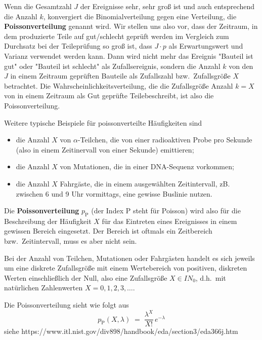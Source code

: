 
Wenn die Gesamtzahl $J$ der Ereignisse sehr, sehr groß ist und auch entsprechend die Anzahl $k$,
konvergiert die Binomialverteilung gegen eine Verteilung, die \textbf{Poissonverteilung} genannt wird.
Wir stellen uns also vor, dass der Zeitraum, in dem produzierte Teile auf gut/schlecht geprüft werden im
Vergleich zum Durchsatz bei der Teileprüfung so groß ist, dass $J \cdot p$ als Erwartungswert und Varianz
verwendet werden kann. Dann wird nicht mehr das Ereignis "Bauteil ist gut" oder "Bauteil ist schlecht"
als Zufallsereignis, sondern die Anzahl $k$ von den $J$ in einem Zeitraum geprüften Bauteile als
Zufallszahl bzw.\ Zufallsgröße $X$ betrachtet. Die Wahrscheinlichkeitsverteilung, die die Zufallsgröße
\glqq Anzahl $k = X$ von in einem Zeitraum als Gut geprüfte Teile\grqq beschreibt, ist also die Poissonverteilung.

Weitere typische Beispiele für poissonverteilte Häufigkeiten sind
\begin{itemize}
\item die Anzahl $X$ von $\alpha$-Teilchen, die von einer radioaktiven Probe pro Sekunde (also in einem Zeitinervall
von einer Sekunde) emittieren;
\item die Anzahl $X$ von Mutationen, die in einer DNA-Sequenz vorkommen;
\item die Anzahl $X$ Fahrgäste, die in einem ausgewählten Zeitintervall, zB. zwischen 6 und 9 Uhr vormittags, eine gewisse Buslinie nutzen.
\end{itemize}

Die \textbf{Poissonverteilung}  $p_\mathrm{P}$ (der Index $\mathrm{P}$ steht für Poisson) wird also für die Beschreibung
der Häufigkeit $X$ für das Eintreten eines Ereignisses in einem gewissen Bereich  eingesetzt.
Der Bereich ist oftmals ein Zeitbereich bzw.\ Zeitintervall, muss es aber nicht sein.

Bei der Anzahl von Teilchen, Mutationen oder Fahrgästen handelt es sich jeweils um eine
diskrete Zufallsgröße mit einem Wertebereich von positiven, diskreten Werten einschließlich der Null,
also eine Zufallsgröße $X \in I\!\!N_0$, d.h.\ mit natürlichen Zahlenwerten $X = 0, 1, 2, 3, \dots$.

Die Poissonverteilung sieht wie folgt aus
\begin{equation}
p_\mathrm{P}(X, \lambda) \; = \; \frac{\lambda^X}{X!} \, e^{-\lambda}
\end{equation}
siehe https://www.itl.nist.gov/div898/handbook/eda/section3/eda366j.htm

